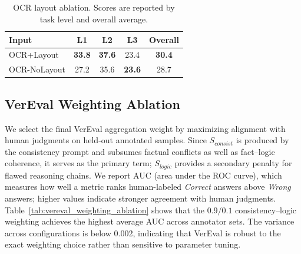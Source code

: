 \subsection{}
\label{sec:ocr_layout_ablation}




\begin{table}[t!]
\centering
\caption{OCR layout ablation. Scores are reported by task level and overall average.}
\label{tab:ocr_layout_ablation}
\small
\begin{tabular}{lcccc}
\toprule
\textbf{Input} & \textbf{L1} & \textbf{L2} & \textbf{L3} & \textbf{Overall} \\
\midrule
OCR+Layout & \textbf{33.8} & \textbf{37.6} & 23.4 & \textbf{30.4} \\
OCR-NoLayout & 27.2 & 35.6 & \textbf{23.6} & 28.7 \\
\bottomrule
\end{tabular}
\end{table}

\subsection{VerEval Weighting Ablation}
\label{sec:vereval_weighting_ablation}
We select the final VerEval aggregation weight by maximizing alignment with human judgments on held-out annotated samples. Since \(S_{consist}\) is produced by the consistency prompt and subsumes factual conflicts as well as fact--logic coherence, it serves as the primary term; \(S_{logic}\) provides a secondary penalty for flawed reasoning chains. We report AUC (area under the ROC curve), which measures how well a metric ranks human-labeled \textit{Correct} answers above \textit{Wrong} answers; higher values indicate stronger agreement with human judgments. Table~\ref{tab:vereval_weighting_ablation} shows that the \(0.9/0.1\) consistency--logic weighting achieves the highest average AUC across annotator sets. The variance across configurations is below 0.002, indicating that VerEval is robust to the exact weighting choice rather than sensitive to parameter tuning.

